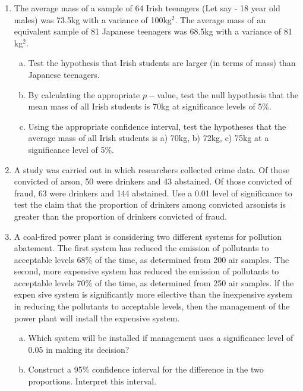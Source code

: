 \documentclass[a4paper,12pt]{article}
\begin{document}
\begin{enumerate}
\item 
The average mass of a sample of 64 Irish teenagers (Let say - 18 year old males) was 73.5kg with a variance of 100kg$^2$. 
The average mass of an equivalent sample of 81 Japanese teenagers was 68.5kg with a variance of 81 kg$^2$. 
\begin{enumerate}[(a)]
\item Test the hypothesis that Irish students are larger (in terms of mass) than Japanese teenagers.
\item By calculating the appropriate $p-$value, test the null hypothesis that the mean mass of all Irish students is 70kg at significance levels of 5\%. 
\item Using the appropriate confidence interval, test the hypotheses that the average mass of all Irish students is a) 70kg, b) 72kg, c) 75kg at a significance level of 5\%.
\end{enumerate}




\item A study was carried out in which researchers collected crime data. Of those convicted of
arson, 50 were drinkers and 43 abstained. Of those convicted of fraud, 63 were drinkers and 144
abstained. Use a 0.01 level of significance to test the claim that the proportion of drinkers among
convicted arsonists is greater than the proportion of drinkers convicted of fraud.




\item 
A coal-fired power plant is considering two different systems for pollution abatement.
The first system has reduced the emission of pollutants to acceptable levels 68\% of the time,
as determined from 200 air samples. The second, more expensive system has reduced the
emission of
pollutants to acceptable levels 70\% of the time, as determined from 250 air samples. lf the
expen sive system is significantly more eilective than the inexpensive system in reducing the
pollutants to acceptable levels, then the management of the power plant will install the
expensive system.

\begin{enumerate}[(a)]
\item Which system will be installed if management uses a significance level of 0.05 in making
its decision?
\item Construct a 95\% confidence interval for the difference in the two proportions. Interpret
this interval.
\end{enumerate}



\end{enumerate}
\end{document}

